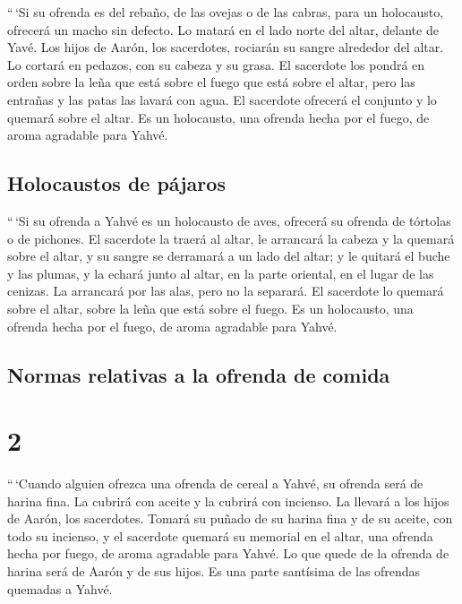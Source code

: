  ``\,`Si su ofrenda es del rebaño, de las ovejas o de las
cabras, para un holocausto, ofrecerá un macho sin defecto.
 Lo matará en el lado norte del altar, delante de Yavé.
Los hijos de Aarón, los sacerdotes, rociarán su sangre alrededor del
altar.  Lo cortará en pedazos, con su cabeza y su grasa.
El sacerdote los pondrá en orden sobre la leña que está sobre el fuego
que está sobre el altar,  pero las entrañas y las patas
las lavará con agua. El sacerdote ofrecerá el conjunto y lo quemará
sobre el altar. Es un holocausto, una ofrenda hecha por el fuego, de
aroma agradable para Yahvé.

\hypertarget{holocaustos-de-puxe1jaros}{%
\subsection{Holocaustos de pájaros}\label{holocaustos-de-puxe1jaros}}

 ``\,`Si su ofrenda a Yahvé es un holocausto de aves,
ofrecerá su ofrenda de tórtolas o de pichones.  El
sacerdote la traerá al altar, le arrancará la cabeza y la quemará sobre
el altar, y su sangre se derramará a un lado del altar; 
y le quitará el buche y las plumas, y la echará junto al altar, en la
parte oriental, en el lugar de las cenizas.  La arrancará
por las alas, pero no la separará. El sacerdote lo quemará sobre el
altar, sobre la leña que está sobre el fuego. Es un holocausto, una
ofrenda hecha por el fuego, de aroma agradable para Yahvé.

\hypertarget{normas-relativas-a-la-ofrenda-de-comida}{%
\subsection{Normas relativas a la ofrenda de
comida}\label{normas-relativas-a-la-ofrenda-de-comida}}

\hypertarget{section-1}{%
\section{2}\label{section-1}}

 ``\,`Cuando alguien ofrezca una ofrenda de cereal a
Yahvé, su ofrenda será de harina fina. La cubrirá con aceite y la
cubrirá con incienso.  La llevará a los hijos de Aarón,
los sacerdotes. Tomará su puñado de su harina fina y de su aceite, con
todo su incienso, y el sacerdote quemará su memorial en el altar, una
ofrenda hecha por fuego, de aroma agradable para Yahvé. 
Lo que quede de la ofrenda de harina será de Aarón y de sus hijos. Es
una parte santísima de las ofrendas quemadas a Yahvé.

